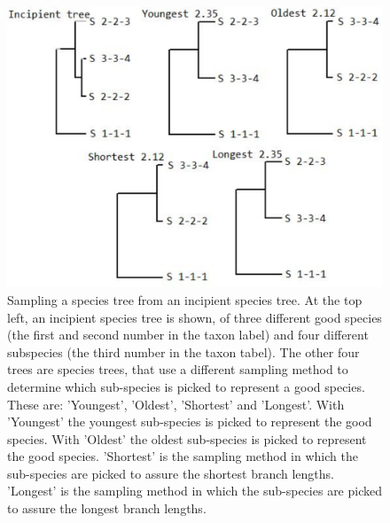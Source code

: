 \begin{figure}[!htbp]
  \includegraphics[width=\textwidth]{fig_sampling_methods.png}
  \caption{
    Sampling a species tree from an incipient species tree. At the top left,
    an incipient species tree is shown, of three different good species (the
    first and second number in the taxon label) and four different subspecies (the
    third number in the taxon tabel). The other four trees are species trees,
    that use a different sampling method to determine which sub-species is picked to
    represent a good species. These are: 'Youngest', 'Oldest', 'Shortest' and
    'Longest'. With 'Youngest' the youngest sub-species is picked to represent the
    good species. With 'Oldest' the oldest sub-species is picked to represent the
    good species. 'Shortest' is the sampling method in which the sub-species are
    picked to assure the shortest branch lengths. 'Longest' is the sampling method 
    in which the sub-species are picked to assure the longest branch lengths.
  }
\end{figure}

